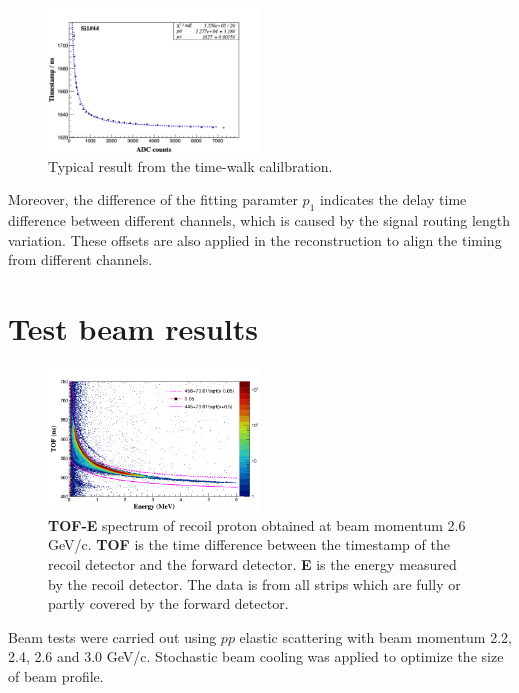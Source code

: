 \documentclass[number,5p]{elsarticle}
\begin{document}
\begin{figure}[htbp]
  \centering
  \includegraphics[width=0.5\textwidth]{./timewalk.png}
  \caption{Typical result from the time-walk calilbration.}
  \label{fig:timewalk}
\end{figure}

Moreover, the difference of the fitting paramter \(p_1\) indicates the delay time
difference between different channels, which is caused by the signal routing length variation.
These offsets are also applied in the reconstruction to align the timing from different channels.

\section{Test beam results}
\label{sec:result}

\begin{figure}[htbp]
\centering
\includegraphics[width=0.5\textwidth]{./tof_e_cut.png}
\caption{
\textbf{TOF-E} spectrum of recoil proton obtained at beam momentum 2.6 GeV/c. \textbf{TOF} is the time difference between the timestamp of the recoil detector and the forward detector. \textbf{E} is the energy measured by the recoil detector. The data is from all strips which are fully or partly covered by the forward detector.}
\label{fig:tof-e}
\end{figure}


Beam tests were carried out using $pp$ elastic scattering with beam momentum 2.2, 2.4, 2.6 and 3.0 GeV/c.
Stochastic beam cooling was applied to optimize the size of beam profile.
\end{document}
